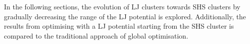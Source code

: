 In the following sections, the evolution of \ac{LJ} clusters towards \ac{SHS}
clusters by gradually decreasing the range of the \ac{LJ} potential is explored.
Additionally, the results from optimising with a \ac{LJ} potential starting from
the \ac{SHS} cluster is compared to the traditional approach of global
optimisation.



